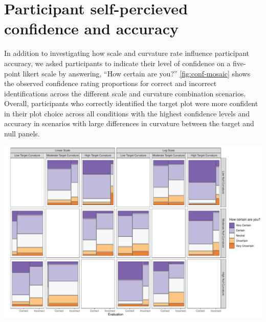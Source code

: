 \documentclass[12pt]{article}
\begin{document}
\renewcommand{\thesection}{C}

\hypertarget{participant-self-percieved-confidence-and-accuracy}{%
\section{Participant self-percieved confidence and
accuracy}\label{participant-self-percieved-confidence-and-accuracy}}

In addition to investigating how scale and curvature rate influence
participant accuracy, we asked participants to indicate their level of
confidence on a five-point likert scale by answering, ``How certain are
you?'' \cref{fig:conf-mosaic} shows the observed confidence rating
proportions for correct and incorrect identifications across the
different scale and curvature combination scenarios. Overall,
participants who correctly identified the target plot were more
confident in their plot choice across all conditions with the highest
confidence levels and accuracy in scenarios with large differences in
curvature between the target and null panels.

\begin{center}\includegraphics[width=\linewidth,]{appendix_files/figure-latex/conf-mosaic-1} \end{center}



\end{document}

